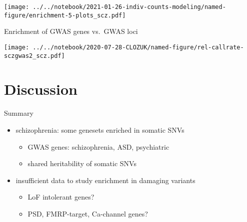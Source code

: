 \documentclass[usenames,dvipsnames]{beamer}
\begin{document}

\begin{frame}[label=results]
\texttt{[image: ../../notebook/2021-01-26-indiv-counts-modeling/named-figure/enrichment-5-plots\_scz.pdf]}
\end{frame}

\begin{frame}{Enrichment of GWAS genes vs.~GWAS loci}
\begin{center}
\texttt{[image: ../../notebook/2020-07-28-CLOZUK/named-figure/rel-callrate-sczgwas2\_scz.pdf]}
\end{center}
\end{frame}

\section{Discussion}




\begin{frame}{Summary}
\begin{itemize}
\item schizophrenia: some genesets enriched in somatic SNVs
\begin{itemize}
	\item GWAS genes: schizophrenia, ASD, psychiatric 
        \item shared heritability of somatic SNVs
\end{itemize}
\item insufficient data to study enrichment in damaging variants
\begin{itemize}
	\item LoF intolerant genes?
	\item PSD, FMRP-target, Ca-channel genes?
\end{itemize}
\end{itemize}
\end{frame}
\end{document}
